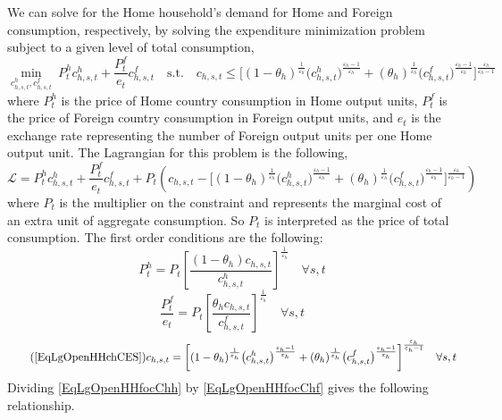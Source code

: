 \documentclass[letterpaper,12pt]{article}
\theoremstyle{definition}
\newcommand\ve{\varepsilon}
\begin{document}
    We can solve for the Home household's demand for Home and Foreign consumption, respectively, by solving the expenditure minimization problem subject to a given level of total consumption,
    \begin{equation}\label{EqLgOpenHHminprobH}
      \min_{c^h_{h,s,t},c^f_{h,s,t}} \: P^h_t c^h_{h,s,t} + \frac{P^f_t}{e_t}c^f_{h,s,t} \quad \text{s.t.} \quad c_{h,s,t} \leq \biggl[(1 - \theta_h)^\frac{1}{\ve_h}\bigl(c^h_{h,s,t}\bigr)^\frac{\ve_h-1}{\ve_h} + (\theta_h)^\frac{1}{\ve_h}\bigl(c^f_{h,s,t}\bigr)^\frac{\ve_h-1}{\ve_h}\biggr]^\frac{\ve_h}{\ve_h-1}
    \end{equation}
    where $P^h_t$ is the price of Home country consumption in Home output units, $P^f_t$ is the price of Foreign country consumption in Foreign output units, and $e_t$ is the exchange rate representing the number of Foreign output units per one Home output unit. The Lagrangian for this problem is the following,
    \begin{equation}\label{EqLgOpenHHlagrH}
      \mathcal{L} = P^h_t c^h_{h,s,t} + \frac{P^f_t}{e_t}c^f_{h,s,t} + P_t\left(c_{h,s,t} - \biggl[(1 - \theta_h)^\frac{1}{\ve_h}\bigl(c^h_{h,s,t}\bigr)^\frac{\ve_h-1}{\ve_h} + (\theta_h)^\frac{1}{\ve_h}\bigl(c^f_{h,s,t}\bigr)^\frac{\ve_h-1}{\ve_h}\biggr]^\frac{\ve_h}{\ve_h-1}\right)
    \end{equation}
    where $P_t$ is the multiplier on the constraint and represents the marginal cost of an extra unit of aggregate consumption. So $P_t$ is interpreted as the price of total consumption. The first order conditions are the following:
    \begin{equation}\label{EqLgOpenHHfocChh}
      P^h_t = P_t\left[\frac{(1-\theta_h) c_{h,s,t}}{c^h_{h,s,t}}\right]^{\frac{1}{\ve_h}} \quad\forall s,t
    \end{equation}
    \begin{equation}\label{EqLgOpenHHfocChf}
      \frac{P^f_t}{e_t} = P_t\left[\frac{\theta_h c_{h,s,t}}{c^f_{h,s,t}}\right]^{\frac{1}{\ve_h}} \quad\forall s,t
    \end{equation}
    \begin{equation}\tag{\ref{EqLgOpenHHchCES}}
      c_{h,s,t}= \biggl[(1 - \theta_h)^\frac{1}{\ve_h}\bigl(c^h_{h,s,t}\bigr)^\frac{\ve_h-1}{\ve_h} + (\theta_h)^\frac{1}{\ve_h}\bigl(c^f_{h,s,t}\bigr)^\frac{\ve_h-1}{\ve_h}\biggr]^\frac{\ve_h}{\ve_h-1} \quad\forall s,t
    \end{equation}
    Dividing \eqref{EqLgOpenHHfocChh} by \eqref{EqLgOpenHHfocChf} gives the following relationship.
\end{document}
